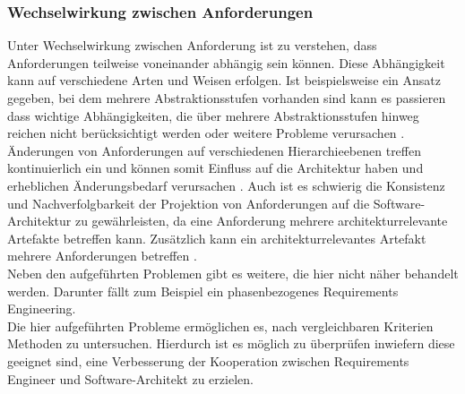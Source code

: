 \subsubsection{Wechselwirkung zwischen Anforderungen}
Unter Wechselwirkung zwischen Anforderung ist zu verstehen, dass Anforderungen teilweise voneinander abh\"angig sein k\"onnen. Diese Abh\"angigkeit kann auf verschiedene Arten und Weisen erfolgen. Ist beispielsweise ein Ansatz gegeben, bei dem mehrere Abstraktionsstufen vorhanden sind kann es passieren dass wichtige Abh\"angigkeiten, die \"uber mehrere Abstraktionsstufen hinweg reichen nicht ber\"ucksichtigt werden oder weitere Probleme verursachen \cite{Sik01}. \"Anderungen von Anforderungen auf verschiedenen Hierarchieebenen treffen kontinuierlich ein und k\"onnen somit Einfluss auf die Architektur haben und erheblichen \"Anderungsbedarf verursachen \cite{Zor01}. Auch ist es schwierig die Konsistenz und Nachverfolgbarkeit der Projektion von Anforderungen auf die Software-Architektur zu gew\"ahrleisten, da eine Anforderung mehrere architekturrelevante Artefakte betreffen kann. Zus\"atzlich kann ein architekturrelevantes Artefakt mehrere Anforderungen betreffen \cite{Gru01}.\\

Neben den aufgef\"uhrten Problemen gibt es weitere, die hier nicht n\"aher behandelt werden. Darunter f\"allt zum Beispiel ein phasenbezogenes Requirements Engineering.
\\

Die hier aufgeführten Probleme ermöglichen es, nach vergleichbaren Kriterien Methoden zu untersuchen. Hierdurch ist es möglich zu überprüfen inwiefern diese geeignet sind, eine Verbesserung der Kooperation zwischen Requirements Engineer und Software-Architekt zu erzielen. \\
